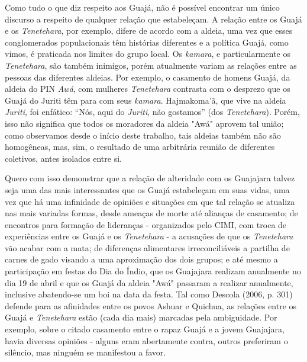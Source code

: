 Como tudo o que diz respeito aos Guajá, não é possível encontrar um
único discurso a respeito de qualquer relação que estabeleçam. A relação
entre os Guajá e os \emph{Tenetehara}, por exemplo, difere de acordo com
a aldeia, uma vez que esses conglomerados populacionais têm histórias
diferentes e a política Guajá, como vimos, é praticada nos limites do
grupo local. Os \emph{kamara}, e particularmente os \emph{Tenetehara},
são também inimigos, porém atualmente variam as relações entre as
pessoas das diferentes aldeias. Por exemplo, o casamento de homens
Guajá, da aldeia do PIN \emph{Awá}, com mulheres \emph{Tenetehara}
contrasta com o desprezo que os Guajá do Juriti têm para com seus
\emph{kamara}. Hajmakoma'ã, que vive na aldeia \emph{Juriti}, foi
enfático: ``Nós, aqui do \emph{Juriti}, não gostamos'' (dos
\emph{Tenetehara}). Porém, isso não significa que todos os moradores da
aldeia "Awá" aprovem tal união; como observamos desde o início deste
trabalho, tais aldeias também não são homogêneas, mas, sim, o resultado
de uma arbitrária reunião de diferentes coletivos, antes isolados entre
si.

Quero com isso demonstrar que a relação de alteridade com os Guajajara
talvez seja uma das mais interessantes que os Guajá estabeleçam em suas
vidas, uma vez que há uma infinidade de opiniões e situações em que tal
relação se atualiza nas mais variadas formas, desde ameaças de morte até
alianças de casamento; de encontros para formação de lideranças -
organizados pelo CIMI, com troca de experiências entre os Guajá e os
\emph{Tenetehara} - a acusações de que os \emph{Tenetehara} vão acabar
com a mata; de diferenças alimentares irreconciliáveis a partilha de
carnes de gado visando a uma aproximação dos dois grupos; e até mesmo a
participação em festas do Dia do Índio, que os Guajajara realizam
anualmente no dia 19 de abril e que os Guajá da aldeia "Awá" passaram a
realizar anualmente, inclusive abatendo-se um boi na data da festa. Tal
como Descola (2006, p. 301) defende para as afinidades entre os povos
Ashuar e Quichua, as relações entre os Guajá e \emph{Tenetehara} estão
(cada dia mais) marcadas pela ambiguidade. Por exemplo, sobre o citado
casamento entre o rapaz Guajá e a jovem Guajajara, havia diversas
opiniões - alguns eram abertamente contra, outros preferiram o silêncio,
mas ninguém se manifestou a favor.

